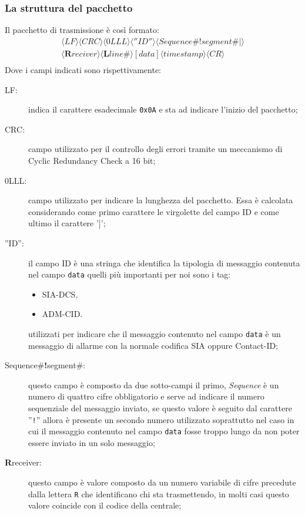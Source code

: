 \subsubsection{La struttura del pacchetto}
Il pacchetto di trasmissione è così formato:
$$
\begin{array}{c}
\langle LF\rangle\langle CRC\rangle\langle 0LLL\rangle\langle ''ID''\rangle\langle Sequence\#\textbf{!}segment\#|\rangle\\\langle\textbf{R}reciver\rangle\langle\textbf{L}line\#\rangle
{[data]}\langle timestamp\rangle \langle CR\rangle\\
\end{array}	 
$$
Dove i campi indicati sono rispettivamente:
\begin{description}
	\item[LF:] indica il carattere esadecimale \texttt{0x0A} e sta ad indicare l'inizio del pacchetto;
	\item[CRC:] campo utilizzato per il controllo degli errori tramite un meccanismo di Cyclic Redundancy Check a 16 bit;
	\item[0LLL:] campo utilizzato per indicare la lunghezza del pacchetto. Essa è calcolata considerando come primo carattere le virgolette del campo ID e come ultimo il carattere '$ ] $';
	\item[''ID'':] il campo ID è una stringa che identifica la tipologia di messaggio contenuta nel campo \texttt{data} quelli più importanti per noi sono i tag:
	\begin{itemize}
		\item SIA-DCS,
		\item ADM-CID.
	\end{itemize}
	utilizzati per indicare che il messaggio contenuto nel campo \texttt{data} è un messaggio di allarme con la normale codifica SIA oppure Contact-ID;
	\item[Sequence\#\textbf{!}segment\#:] questo campo è composto da due sotto-campi il primo, \emph{Sequence} è un numero di quattro cifre obbligatorio e serve ad indicare il numero sequenziale del messaggio inviato, se questo valore è seguito dal carattere ''\texttt{!}'' allora è presente un secondo numero utilizzato soprattutto nel caso in cui il messaggio contenuto nel campo \texttt{data} fosse troppo lungo da non poter essere inviato in un solo messaggio;
	\item[\textbf{R}receiver:] questo campo è valore composto da un numero variabile di cifre precedute dalla lettera \texttt{R} che identificano chi sta trasmettendo, in molti casi questo valore coincide con il codice della centrale;

\end{description}
